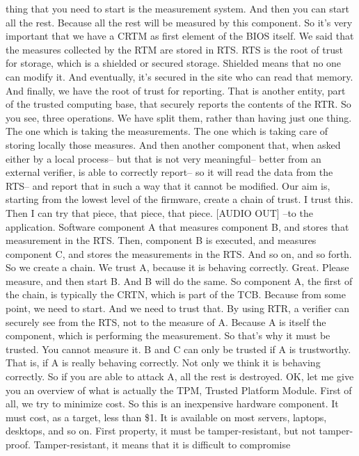  thing that you need to start is the measurement system. And then you can start
 all the rest. Because all the rest will be measured by this component. So it's
 very important that we have a CRTM as first element of the BIOS itself. We
 said that the measures collected by the RTM are stored in RTS. RTS is the root
 of trust for storage, which is a shielded or secured storage. Shielded means
 that no one can modify it. And eventually, it's secured in the site who can
 read that memory. And finally, we have the root of trust for reporting. That
 is another entity, part of the trusted computing base, that securely reports
 the contents of the RTR. So you see, three operations. We have split them,
 rather than having just one thing. The one which is taking the measurements.
 The one which is taking care of storing locally those measures. And then
 another component that, when asked either by a local process-- but that is not
 very meaningful-- better from an external verifier, is able to correctly
 report-- so it will read the data from the RTS-- and report that in such a way
 that it cannot be modified. Our aim is, starting from the lowest level of the
 firmware, create a chain of trust. I trust this. Then I can try that piece,
 that piece, that piece. [AUDIO OUT] --to the application. Software component A
 that measures component B, and stores that measurement in the RTS. Then,
 component B is executed, and measures component C, and stores the measurements
 in the RTS. And so on, and so forth. So we create a chain. We trust A, because
 it is behaving correctly. Great. Please measure, and then start B. And B will
 do the same. So component A, the first of the chain, is typically the CRTN,
 which is part of the TCB. Because from some point, we need to start. And we
 need to trust that. By using RTR, a verifier can securely see from the RTS,
 not to the measure of A. Because A is itself the component, which is
 performing the measurement. So that's why it must be trusted. You cannot
 measure it. B and C can only be trusted if A is trustworthy. That is, if A is
 really behaving correctly. Not only we think it is behaving correctly. So if
 you are able to attack A, all the rest is destroyed. OK, let me give you an
 overview of what is actually the TPM, Trusted Platform Module. First of all,
 we try to minimize cost. So this is an inexpensive hardware component. It must
 cost, as a target, less than \$1. It is available on most servers, laptops,
 desktops, and so on. First property, it must be tamper-resistant, but not
 tamper-proof. Tamper-resistant, it means that it is difficult to compromise
